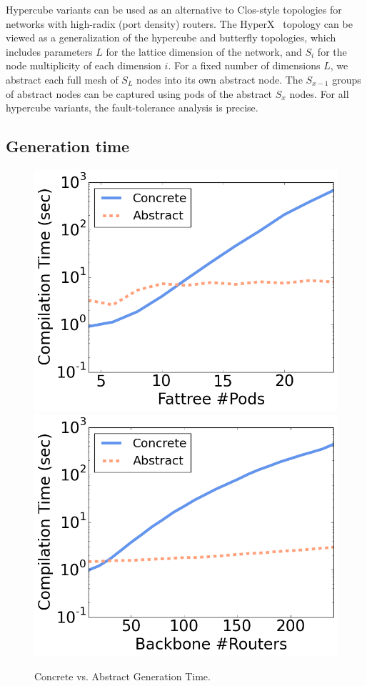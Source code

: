 \documentclass[numbers, 10pt, preprint]{sigplanconf}
\newcommand{\para}[1]{\paragraph*{\textbf{#1}}}
\begin{document}
Hypercube variants can be used as an alternative to Clos-style topologies for networks with high-radix (port density) routers. The HyperX~\cite{hyperx} topology can be viewed as a generalization of the hypercube and butterfly topologies, which includes parameters $L$ for the lattice dimension of the network, and $S_i$ for the node multiplicity of each dimension $i$.
For a fixed number of dimensions $L$, we abstract each full mesh of $S_L$ nodes into its own abstract node. The $S_{x-1}$ groups of abstract nodes can be captured using pods of the abstract $S_x$ nodes. For all hypercube variants, the fault-tolerance analysis is precise.

%


\subsection{Generation time}

\begin{figure}[t!]
    {\includegraphics[width=.49\columnwidth]{figures/Fattree-time.png}}
    {\includegraphics[width=.49\columnwidth]{figures/backbone-time.png}} \\
  \vspace{-.6em}
  \caption{Concrete vs. Abstract Generation Time. \label{fig:compilation-times}}
  \vspace{-1em}
\end{figure}
\end{document}
